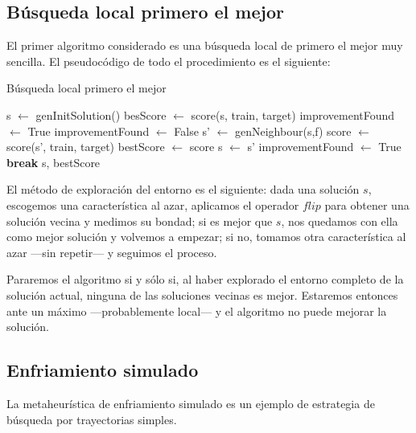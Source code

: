 \documentclass[a4paper, 11pt, titlepage]{article}
\begin{document}
    \subsection{Búsqueda local primero el mejor}
    El primer algoritmo considerado es una búsqueda local de primero el mejor muy sencilla. El pseudocódigo de todo el procedimiento es el siguiente:

    \begin{algorithm}
        \caption{Búsqueda local primero el mejor}\label{primMejor}
        \begin{algorithmic}[1]
            \State s $\gets$ genInitSolution()
            \State besScore $\gets$ score(s, train, target)
            \State improvementFound $\gets$ True
            \State improvementFound $\gets$ False
             
            \State s' $\gets$ genNeighbour(s,f)
            \State score $\gets$ score(s', train, target)
            \State bestScore $\gets$ score
            \State s $\gets$ s'
            \State improvementFound $\gets$ True
            \State \textbf{break}
            \EndIf
            \EndFor
            \EndWhile
            \State \Return s, bestScore
            \EndFunction
        \end{algorithmic}
    \end{algorithm}

    El método de exploración del entorno es el siguiente: dada una solución $s$, escogemos una característica al azar, aplicamos el operador $flip$ para obtener una solución vecina y medimos su bondad; si es mejor que $s$, nos quedamos con ella como mejor solución y volvemos a empezar; si no, tomamos otra característica al azar ---sin repetir--- y seguimos el proceso.

    Pararemos el algoritmo si y sólo si, al haber explorado el entorno completo de la solución actual, ninguna de las soluciones vecinas es mejor. Estaremos entonces ante un máximo ---probablemente local--- y el algoritmo no puede mejorar la solución.

    \subsection{Enfriamiento simulado}

    La metaheurística de enfriamiento simulado es un ejemplo de estrategia de búsqueda por trayectorias simples.
\end{document}
